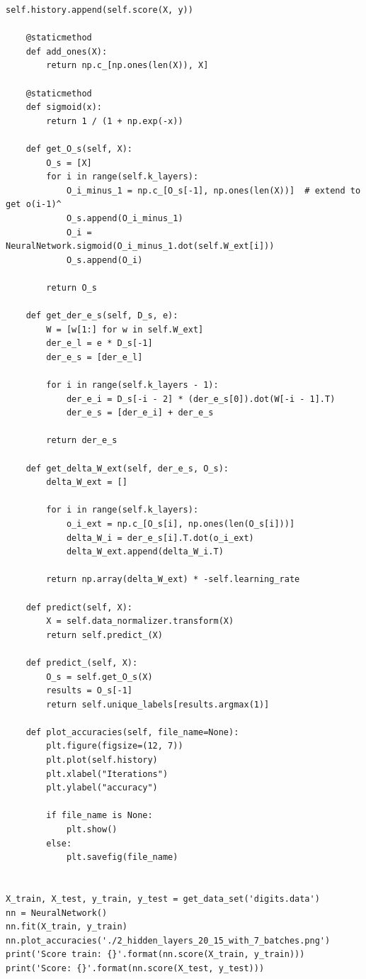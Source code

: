 \begin{lstlisting}[style=py]
                self.history.append(self.score(X, y))

    @staticmethod
    def add_ones(X):
        return np.c_[np.ones(len(X)), X]

    @staticmethod
    def sigmoid(x):
        return 1 / (1 + np.exp(-x))

    def get_O_s(self, X):
        O_s = [X]
        for i in range(self.k_layers):
            O_i_minus_1 = np.c_[O_s[-1], np.ones(len(X))]  # extend to get o(i-1)^
            O_s.append(O_i_minus_1)
            O_i = NeuralNetwork.sigmoid(O_i_minus_1.dot(self.W_ext[i]))
            O_s.append(O_i)

        return O_s

    def get_der_e_s(self, D_s, e):
        W = [w[1:] for w in self.W_ext]
        der_e_l = e * D_s[-1]
        der_e_s = [der_e_l]

        for i in range(self.k_layers - 1):
            der_e_i = D_s[-i - 2] * (der_e_s[0]).dot(W[-i - 1].T)
            der_e_s = [der_e_i] + der_e_s

        return der_e_s

    def get_delta_W_ext(self, der_e_s, O_s):
        delta_W_ext = []

        for i in range(self.k_layers):
            o_i_ext = np.c_[O_s[i], np.ones(len(O_s[i]))]
            delta_W_i = der_e_s[i].T.dot(o_i_ext)
            delta_W_ext.append(delta_W_i.T)

        return np.array(delta_W_ext) * -self.learning_rate

    def predict(self, X):
        X = self.data_normalizer.transform(X)
        return self.predict_(X)

    def predict_(self, X):
        O_s = self.get_O_s(X)
        results = O_s[-1]
        return self.unique_labels[results.argmax(1)]

    def plot_accuracies(self, file_name=None):
        plt.figure(figsize=(12, 7))
        plt.plot(self.history)
        plt.xlabel("Iterations")
        plt.ylabel("accuracy")

        if file_name is None:
            plt.show()
        else:
            plt.savefig(file_name)


X_train, X_test, y_train, y_test = get_data_set('digits.data')
nn = NeuralNetwork()
nn.fit(X_train, y_train)
nn.plot_accuracies('./2_hidden_layers_20_15_with_7_batches.png')
print('Score train: {}'.format(nn.score(X_train, y_train)))
print('Score: {}'.format(nn.score(X_test, y_test)))

\end{lstlisting}


